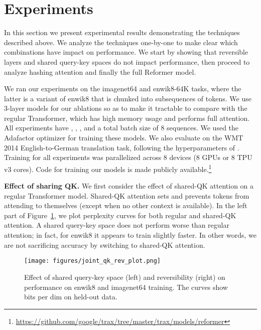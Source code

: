 \documentclass{article} \usepackage{iclr2020_conference,times}
\renewcommand{\paragraph}[1]{\textbf{#1}}
\begin{document}
\section{Experiments} \label{sec:exp}

In this section we present experimental results demonstrating the techniques
described above. We analyze the techniques one-by-one to make clear which
combinations have impact on performance. We start by showing that reversible
layers and shared query-key spaces do not impact performance, then proceed 
to analyze hashing attention and finally the full Reformer model.

We ran our experiments on the imagenet64 and enwik8-64K tasks, where the latter is a variant of enwik8 that is chunked into subsequences of  tokens. We use 3-layer models for our ablations so as to make it tractable to compare with the regular Transformer, which has high memory usage and performs full  attention. All experiments have , , , and a total batch size of 8 sequences. We used the Adafactor optimizer \citep{adafactor} for training these models. We also evaluate on the WMT 2014 English-to-German translation task, following the hyperparameters of \citet{transformer}. Training for all experiments was parallelized across 8 devices (8 GPUs or 8 TPU v3 cores). Code for training our models is made publicly available.\footnote{\url{https://github.com/google/trax/tree/master/trax/models/reformer}}

\paragraph{Effect of sharing QK.} \label{sec:exp_qk}
We first consider the effect of shared-QK attention on a regular Transformer model. Shared-QK attention sets  and prevents tokens from attending to themselves (except when no other context is available). In the left part of Figure~\ref{fig:share-qk-rev}, we plot perplexity curves for both regular and shared-QK attention. A shared query-key space does not perform worse than regular attention; in fact, for enwik8 it appears to train slightly faster. In other words, we are not sacrificing accuracy by switching to shared-QK attention. 

\begin{figure}[t]
    \centering
    \texttt{[image: figures/joint\_qk\_rev\_plot.png]}
    \caption{Effect of shared query-key space (left) and reversibility (right) on 
    performance on enwik8 and imagenet64 training. The curves show bits per dim on held-out data.}
    \label{fig:share-qk-rev}
\end{figure}
\end{document}
